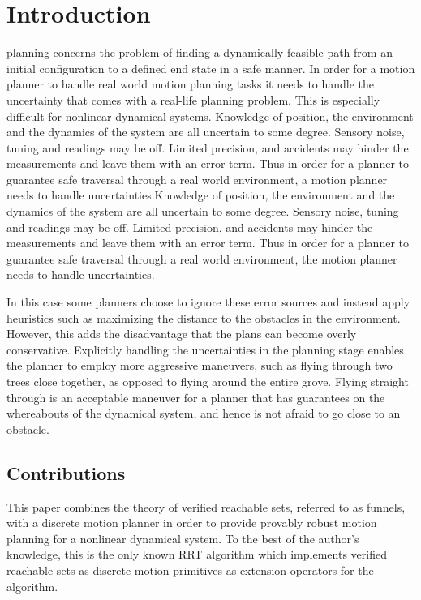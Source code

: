 
\section{Introduction}
 planning concerns the problem of finding a dynamically
feasible path from an initial configuration to a defined end state in a safe
manner. In order for a motion planner to handle real world motion planning tasks
it needs to handle the uncertainty that comes with a real-life planning problem.
This is especially difficult for nonlinear dynamical systems. Knowledge of
position, the environment and the dynamics of the system are all uncertain to
some degree. Sensory noise, tuning and readings may be off. Limited precision,
and accidents may hinder the measurements and leave them with an error term.
Thus in order for a planner to guarantee safe traversal through a real world
environment, a motion planner needs to handle uncertainties.Knowledge of
position, the environment and the dynamics of the system are all uncertain to
some degree. Sensory noise, tuning and readings may be off. Limited precision,
and accidents may hinder the measurements and leave them with an error term.
Thus in order for a planner to guarantee safe traversal through a real world
environment, the motion planner needs to handle uncertainties.

In this case some planners choose to ignore these error sources and instead
apply heuristics such as maximizing the distance to the obstacles in the
environment. However, this adds the disadvantage that the plans can become
overly conservative. Explicitly handling the uncertainties in the planning stage
enables the planner to employ more aggressive maneuvers, such as flying through
two trees close together, as opposed to flying around the entire grove. Flying
straight through is an acceptable maneuver for a planner that has guarantees on
the whereabouts of the dynamical system, and hence is not afraid to go close to
an obstacle.

\subsection{Contributions}

This paper combines the theory of verified reachable sets, referred to as
funnels, with a discrete  motion planner in order to provide provably
robust motion planning for a nonlinear dynamical system. To the best of the
author's knowledge, this is the only known \ac{RRT} algorithm which implements
verified reachable sets as discrete motion primitives as extension operators for
the algorithm.

